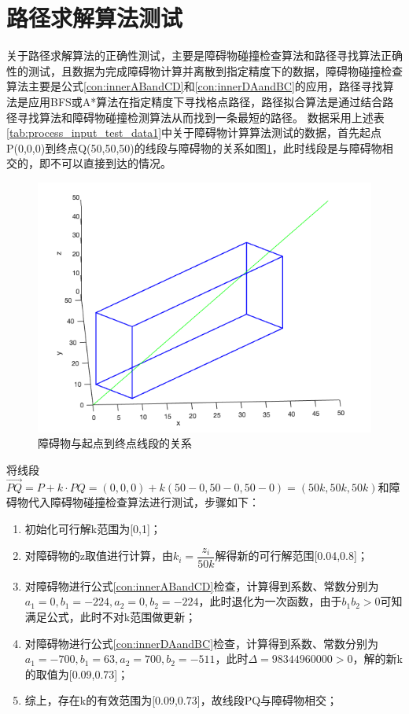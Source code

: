 \section{路径求解算法测试}
\par 关于路径求解算法的正确性测试，主要是障碍物碰撞检查算法和路径寻找算法正确性的测试，且数据为完成障碍物计算并离散到指定精度下的数据，障碍物碰撞检查算法主要是公式\ref{con:innerABandCD}和\ref{con:innerDAandBC}的应用，路径寻找算法是应用BFS或A*算法在指定精度下寻找格点路径，路径拟合算法是通过结合路径寻找算法和障碍物碰撞检测算法从而找到一条最短的路径。
数据采用上述表\ref{tab:process_input_test_data1}中关于障碍物计算算法测试的数据，首先起点P(0,0,0)到终点Q(50,50,50)的线段与障碍物的关系如图\ref{fig:insect_ex_insected}，此时线段是与障碍物相交的，即不可以直接到达的情况。
\begin{figure}[htb]
    \centering
    \caption{障碍物与起点到终点线段的关系}
    \label{fig:insect_ex_insected}
    \includegraphics[width=12cm]{figures/insect_ex_insected.png}
\end{figure}
将线段$\vec{PQ}=P+k\cdot PQ=(0,0,0)+k(50-0,50-0,50-0)=(50k,50k,50k)$和障碍物代入障碍物碰撞检查算法进行测试，步骤如下：
\begin{enumerate}
    \item 初始化可行解k范围为[0,1]；
    \item 对障碍物的z取值进行计算，由$k_i=\dfrac{z_i}{50k}$解得新的可行解范围[0.04,0.8]；
    \item 对障碍物进行公式\ref{con:innerABandCD}检查，计算得到系数、常数分别为$a_1=0,b_1=-224,a_2=0,b_2=-224$，此时退化为一次函数，由于$b_1b_2>0$可知满足公式，此时不对k范围做更新；
    \item 对障碍物进行公式\ref{con:innerDAandBC}检查，计算得到系数、常数分别为$a_1=-700,b_1=63,a_2=700,b_2=-511$，此时$\Delta=98344960000>0$，解的新k的取值为[0.09,0.73]；
    \item 综上，存在k的有效范围为[0.09,0.73]，故线段PQ与障碍物相交；
\end{enumerate}
